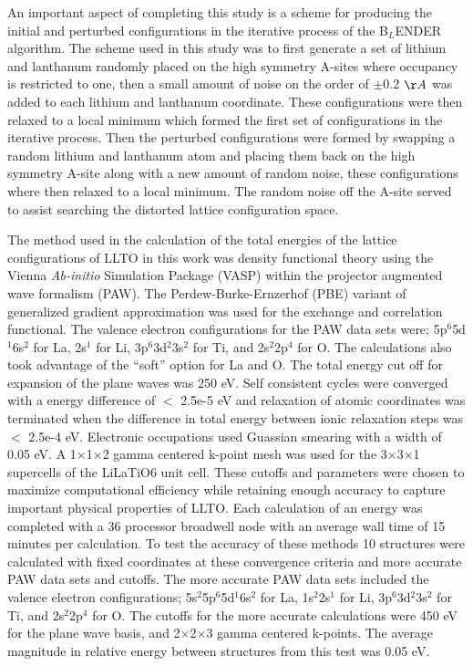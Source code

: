 \documentclass[aps,pre,reprint,superscriptaddress,showkeys]{revtex4-1}
\begin{document}
An important aspect of completing this study is a scheme for producing the initial and perturbed configurations in the iterative process of the B$_L$ENDER algorithm. The scheme used in this study was to first generate a set of lithium and lanthanum randomly placed on the high symmetry A-sites where occupancy is restricted to one, then a small amount of noise on the order of $\pm$0.2 $\AA$ was added to each lithium and lanthanum coordinate. These configurations were then relaxed to a local minimum which formed the first set of configurations in the iterative process.  Then the perturbed configurations  were formed by swapping a random lithium and lanthanum atom and placing them back on the high symmetry A-site along with a new amount of random noise, these configurations where then relaxed to a local minimum. The random noise off the A-site served to assist searching the distorted lattice configuration space. 

The method used in the calculation of the total energies of the lattice configurations of LLTO in this work was density functional theory using the Vienna \textit{Ab-initio} Simulation Package (VASP) \cite{Vasp1,Vasp2,Vasp3,Vasp4} within the projector augmented wave formalism (PAW)\cite{Blochl}. The Perdew-Burke-Ernzerhof (PBE) variant of generalized gradient approximation was used for the exchange and correlation functional\cite{PBE}. The valence electron configurations for the PAW data sets were; 5p$^{6}$5d$^{1}$6s$^{2}$ for La, 2s$^{1}$ for Li, 3p$^{6}$3d$^{2}$3s$^{2}$ for Ti, and 2s$^{2}$2p$^{4}$ for O. The calculations also took advantage of the ``soft'' option for La and O.   The total energy cut off for expansion of the plane waves was 250 eV.  Self consistent cycles were converged with a energy difference of $<$ 2.5e-5 eV and relaxation  of atomic coordinates was terminated when the difference in total energy between ionic relaxation steps was $<$ 2.5e-4 eV. Electronic occupations used Guassian smearing with a width of 0.05 eV.  A 1$\times$1$\times$2 gamma centered k-point mesh was used for the 3$\times$3$\times$1 supercells of the LiLaTiO6 unit cell. These cutoffs and parameters were chosen to maximize computational efficiency while retaining enough accuracy to capture important physical properties of LLTO.  Each calculation of an energy was completed with a 36 processor broadwell node with an average wall time of 15 minutes per calculation.  To test the accuracy of these methods 10 structures were calculated with fixed coordinates at these convergence criteria and more accurate PAW data sets and cutoffs. The more accurate PAW data sets included the valence electron configurations; 5s$^{2}$5p$^{6}$5d$^{1}$6s$^{2}$ for La, 1s$^2$2s$^{1}$ for Li, 3p$^{6}$3d$^{2}$3s$^{2}$ for Ti, and 2s$^{2}$2p$^{4}$ for O.  The cutoffs for the more accurate calculations were 450 eV for the plane wave basis, and 2$\times$2$\times$3 gamma centered k-points. The average magnitude  in relative energy between structures from this test was 0.05 eV. 
\end{document}
